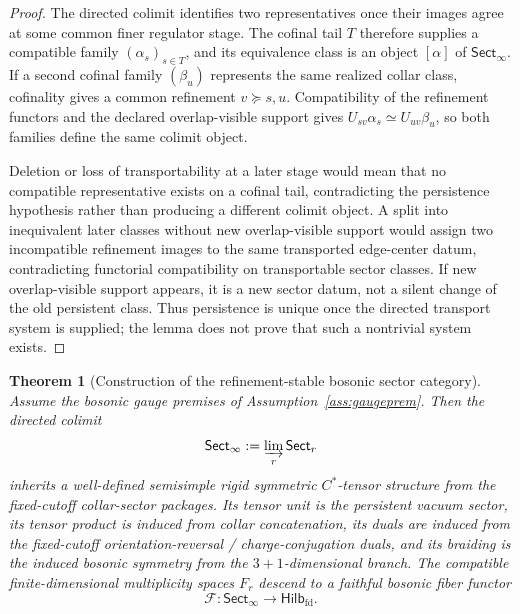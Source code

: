 \documentclass[11pt]{article}
\newtheorem{theorem}{Theorem}[section]
\begin{document}
\begin{proof}
The directed colimit identifies two representatives once their images agree at some common finer regulator stage. The cofinal tail \(T\) therefore supplies a compatible family \((\alpha_s)_{s\in T}\), and its equivalence class is an object \([\alpha]\) of \(\mathsf{Sect}_\infty\). If a second cofinal family \((\beta_u)\) represents the same realized collar class, cofinality gives a common refinement \(v\succeq s,u\). Compatibility of the refinement functors and the declared overlap-visible support gives \(U_{sv}\alpha_s\simeq U_{uv}\beta_u\), so both families define the same colimit object.

Deletion or loss of transportability at a later stage would mean that no compatible representative exists on a cofinal tail, contradicting the persistence hypothesis rather than producing a different colimit object. A split into inequivalent later classes without new overlap-visible support would assign two incompatible refinement images to the same transported edge-center datum, contradicting functorial compatibility on transportable sector classes. If new overlap-visible support appears, it is a new sector datum, not a silent change of the old persistent class. Thus persistence is unique once the directed transport system is supplied; the lemma does not prove that such a nontrivial system exists.
\end{proof}

\begin{theorem}[Construction of the refinement-stable bosonic sector category]\label{thm:sector-colimit}
Assume the bosonic gauge premises of Assumption~\ref{ass:gaugeprem}. Then the directed colimit
\[
\mathsf{Sect}_\infty:=\varinjlim_r \mathsf{Sect}_r
\]
inherits a well-defined semisimple rigid symmetric \(C^*\)-tensor structure from the fixed-cutoff collar-sector packages. Its tensor unit is the persistent vacuum sector, its tensor product is induced from collar concatenation, its duals are induced from the fixed-cutoff orientation-reversal / charge-conjugation duals, and its braiding is the induced bosonic symmetry from the \(3+1\)-dimensional branch. The compatible finite-dimensional multiplicity spaces \(F_r\) descend to a faithful bosonic fiber functor
\[
\mathcal F:\mathsf{Sect}_\infty\to\mathsf{Hilb}_{\mathrm{fd}}.
\]
\end{theorem}
\end{document}
